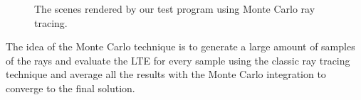 \begin{figure}[htp]
\begin{center}
    \renewcommand{\thefigure}{\thechapter.\arabic{figure}}
    \caption[Test Scenes Rendered Using Monte-Carlo Ray Tracing]{The scenes rendered by our test program using Monte Carlo ray tracing. }
    \label{fig:rt_images}
\end{center}
\end{figure}

The idea of the Monte Carlo technique is to generate a large amount of samples of the rays and evaluate the LTE for every sample using the classic ray tracing technique and average all the results with the Monte Carlo integration to converge to the final solution.

